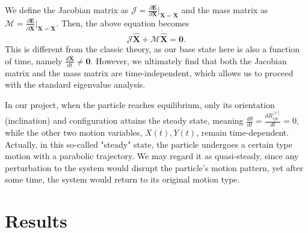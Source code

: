 \documentclass[a4paper,12pt]{report}
\begin{document}
We define the Jacobian matrix as $\mathbf{\mathcal{J}}=\frac{\partial \mathbf{E}}{\partial \mathbf{X}}\Big|_{\mathbf{X}=\bar{\mathbf{X}}}$ and the mass matrix as $\mathbf{\mathcal{M}}=\frac{\partial \mathbf{E}}{\partial \dot{\mathbf{X}}}\Big|_{\mathbf{X}=\bar{\mathbf{X}}}$. Then, the above equation becomes 
\begin{equation}
	\label{eqn:111}
\mathbf{\mathcal{J}}\hat{\mathbf{X}}+\mathbf{\mathcal{M}}\dot{\hat{\mathbf{X}}}=\mathbf{0}.
\end{equation}
This is different from the classic theory, as our base state here is also a function of time, namely $\frac{d\bar{\mathbf{X}}}{dt}\neq\mathbf{0}$. However, we ultimately find that both the Jacobian matrix and the mass matrix are time-independent, which allows us to proceed with the standard eigenvalue analysis.

 In our project, when the particle reaches equilibrium, only its orientation (inclination) and configuration attains the steady state, meaning  $\frac{d\theta}{dt}=\frac{dR_{ijk}^{[e]}}{dt}=0$, while the other two motion variables, $X(t), Y(t)$, remain time-dependent. Actually, in this so-called "steady" state, the particle undergoes a certain type motion with a parabolic trajectory. We may regard it as quasi-steady, since any perturbation to the system would disrupt the particle's motion pattern, yet after some time, the system would return to its original motion type. 
 
 \chapter{Results}
\end{document}

